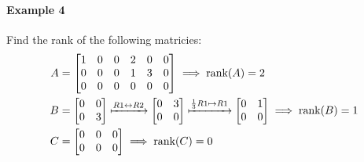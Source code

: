 \paragraph*{Example 4} Find the rank of the following matricies:
\begin{align*}
    A &= \begin{bmatrix}
        1 & 0 & 0 & 2 & 0 & 0 \\
        0 & 0 & 0 & 1 & 3 & 0 \\
        0 & 0 & 0 & 0 & 0 & 0 \\
    \end{bmatrix} \implies \text{rank}(A) = 2 \\
    B &= \begin{bmatrix}
        0 & 0 \\
        0 & 3 \\
    \end{bmatrix} \xmapsto{R1 \leftrightarrow R2} \begin{bmatrix}
        0 & 3 \\
        0 & 0 \\
    \end{bmatrix} \xmapsto{\frac{1}{3}R1 \mapsto R1} \begin{bmatrix}
        0 & 1 \\
        0 & 0 \\
    \end{bmatrix} \implies \text{rank}(B) = 1 \\
    C &= \begin{bmatrix}
        0 & 0 & 0 \\
        0 & 0 & 0 \\
    \end{bmatrix} \implies \text{rank}(C) = 0
\end{align*}